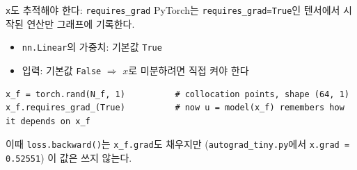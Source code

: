 \documentclass[aspectratio=169,11pt]{beamer}
\begin{document}
\begin{frame}[fragile]{\texttt{x}도 추적해야 한다: \texttt{requires\_grad}}
PyTorch는 \texttt{requires\_grad=True}인 텐서에서 시작된 연산만 그래프에 기록한다.
\begin{itemize}
\item \texttt{nn.Linear}의 가중치: 기본값 \texttt{True}
\item 입력: 기본값 \texttt{False} $\Rightarrow$ $x$로 미분하려면 직접 켜야 한다
\end{itemize}
\begin{lstlisting}
x_f = torch.rand(N_f, 1)          # collocation points, shape (64, 1)
x_f.requires_grad_(True)          # now u = model(x_f) remembers how it depends on x_f
\end{lstlisting}
\vskip2mm
이때 \texttt{loss.backward()}는 \texttt{x\_f.grad}도 채우지만 (\texttt{autograd\_tiny.py}에서 \texttt{x.grad = 0.52551}) 이 값은 쓰지 않는다.
\end{frame}
\end{document}
